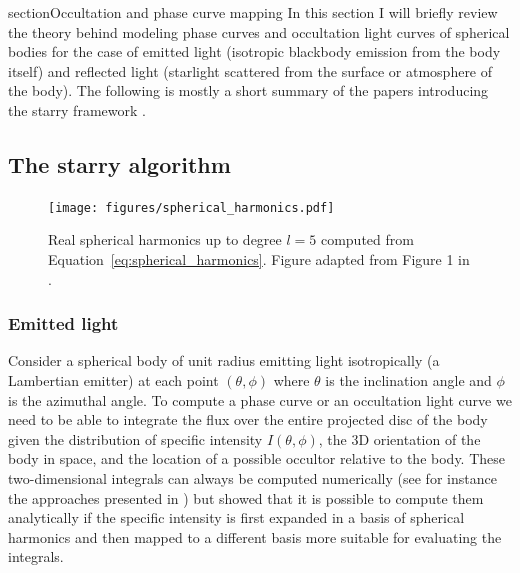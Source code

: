 \documentclass[12pt,dvipsnames]{report}
\newcommand{\ssf}[1]{\textsf{#1}}
\begin{document}
section{Occultation and phase curve mapping}
\label{sec:occultations}
In this section I will briefly review the theory behind modeling phase curves and
occultation light curves of spherical bodies for the case of emitted light
(isotropic blackbody emission from the body itself) and reflected light
(starlight scattered from the surface or atmosphere of the body). The following is
mostly a short summary of the papers introducing the \ssf{starry} framework
\citep{2019AJ....157...64L,2021arXiv210306275L}.
\subsection{The starry algorithm}
\begin{figure}[t]
    \begin{centering}
        \texttt{[image: figures/spherical\_harmonics.pdf]}
        \caption{Real spherical harmonics up to degree $l=5$ computed from
            Equation~\ref{eq:spherical_harmonics}. Figure adapted from Figure 1 in
            \citet{2019AJ....157...64L}.}
        \label{fig:spherical_harmonics}
    \end{centering}
\end{figure}
\subsubsection{Emitted light}
Consider a spherical body of unit radius emitting light isotropically (a
Lambertian emitter) at each point $(\theta,\phi)$ where $\theta$ is the
inclination angle and $\phi$ is the azimuthal angle. To compute a phase curve
or an occultation light curve we need to be able to integrate the flux over the
entire projected disc of the body given the distribution of specific intensity
$I(\theta, \phi)$, the 3D orientation of the body in space, and the location of
a possible occultor relative to the body. These two-dimensional integrals can
always be computed numerically (see for instance the approaches presented in
\citet{2018AJ....156..146F,2018MNRAS.477.2613L}) but
\citet{2019AJ....157...64L} showed that it is possible to compute them
analytically if the specific intensity is first expanded in a basis of
spherical harmonics and then mapped to a different basis more suitable for
evaluating the integrals.
\end{document}
